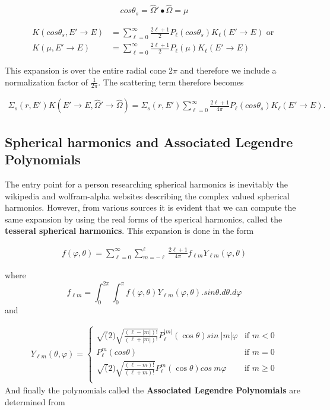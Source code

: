 \documentclass[11pt,letterpaper,titlepage]{article}
\newcommand{\beqn}{\begin{equation}
	\begin{aligned}}
\newcommand{\eeqn}{\end{aligned}
	\end{equation}}
\numberwithin{equation}{section}
\begin{document}
\begin{align*}
cos\theta_s = \hat{\Omega}'\bullet\hat{\Omega} = \mu
\end{align*}

\begin{align*}
K(cos\theta_s,E'{\to}E) &= \sum_{\ell=0}^\infty \frac{2\ell+1}{2} P_\ell (cos\theta_s) K_\ell (E'{\to}E) \text{ or } \\
K(\mu,E'{\to}E) &= \sum_{\ell=0}^\infty \frac{2\ell+1}{2} P_\ell (\mu) K_\ell (E'{\to}E)
\end{align*}

\noindent This expansion is over the entire radial cone $2\pi$ and therefore we include a normalization factor of $\frac{1}{2\pi}$. The scattering term therefore becomes

\begin{align} \label{eq:scatterKernelLegendre}
\Sigma_s (r,E')K(E'{\to}E,\hat{\Omega}'{\to}\hat{\Omega}) = \Sigma_s (r,E')
\sum_{\ell=0}^\infty \frac{2\ell+1}{4\pi} P_\ell (cos\theta_s) K_\ell (E'{\to}E).
\end{align} 

\subsection{Spherical harmonics and Associated Legendre Polynomials}
The entry point for a person researching spherical harmonics is inevitably the wikipedia and wolfram-alpha websites describing the complex valued spherical harmonics. However, from various sources it is evident that we can compute the same expansion by using the real forms of the sperical harmonics, called the \textbf{tesseral spherical harmonics}. This expansion is done in the form

\beqn 
f(\varphi,\theta) = \sum_{\ell = 0}^\infty \sum_{m=-\ell}^{\ell} \frac{2\ell+1}{4\pi} f_{\ell m} Y_{\ell m}(\varphi,\theta)
\eeqn 

where
$$
f_{\ell m} = \int_{0}^{2\pi} \int_0^\pi f(\varphi,\theta)Y_{\ell m}(\varphi,\theta).sin\theta.d\theta.d\varphi
$$
and

\beqn
Y_{\ell m} (\theta, \varphi )=
\begin{cases}
 \sqrt(2)\sqrt{  \frac{(\ell-|m|)!}{(\ell+|m|)!}}P_{\ell}^{|m|}(\cos\theta)sin\ {|m|\varphi}
& \text{if } m < 0 \\
 P_{\ell}^{m}(cos\theta) & \text{if } m = 0 \\
 \sqrt(2)\sqrt{    \frac{(\ell-m)!}{(\ell+m)!}}P_{\ell}^{m}(\cos\theta)cos\ {m\varphi}
& \text{if } m \ge 0 \\
\end{cases}
\eeqn
\newline
And finally the polynomials called the \textbf{Associated Legendre Polynomials} are determined from
\end{document}
